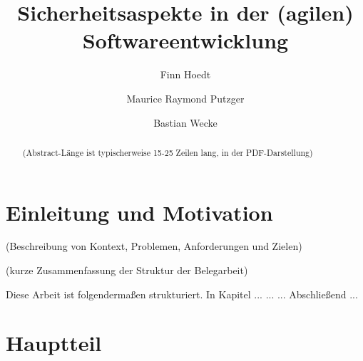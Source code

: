 \documentclass[acmtog]{acmart}
\begin{document}
\title{Sicherheitsaspekte in der (agilen) Softwareentwicklung}

\author{Finn Hoedt}
\author{Maurice Raymond Putzger}
\authornotemark[1]
\author{Bastian Wecke}
\authornotemark[1]
\renewcommand{\shortauthors}{Hoedt, Putzger und Wecke}

\begin{abstract}
  (Abstract-Länge ist typischerweise 15-25 Zeilen lang, in der PDF-Darstellung) 
  
  
\end{abstract}

\maketitle

\section{Einleitung und Motivation}

(Beschreibung von Kontext, Problemen, Anforderungen und Zielen) 



(kurze Zusammenfassung der Struktur der Belegarbeit)

Diese Arbeit ist folgendermaßen strukturiert. 
In Kapitel ... 
...
...
Abschließend ...



\section{Hauptteil}
\end{document}
